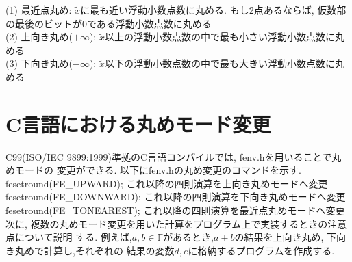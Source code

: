 \documentclass[11pt,a4paper]{jsreport}
\theoremstyle{definition}
\begin{document}
\noindent (1) 最近点丸め: $\tilde{x}$に最も近い浮動小数点数に丸める. もし2点あるならば, 仮数部の最後のビットが0である浮動小数点数に丸める \\
(2) 上向き丸め($+\infty$): $\tilde{x}$以上の浮動小数点数の中で最も小さい浮動小数点数に丸める \\
(3) 下向き丸め($-\infty$): $\tilde{x}$以下の浮動小数点数の中で最も大きい浮動小数点数に丸める \\
\section{C言語における丸めモード変更}
  C99(ISO/IEC 9899:1999)準拠のC言語コンパイルでは, fenv.hを用いることで丸めモードの
変更ができる. 以下にfenv.hの丸め変更のコマンドを示す. \\
	fesetround(FE\_UPWARD); これ以降の四則演算を上向き丸めモードへ変更 \\
	fesetround(FE\_DOWNWARD); これ以降の四則演算を下向き丸めモードへ変更 \\
	fesetround(FE\_TONEAREST); これ以降の四則演算を最近点丸めモードへ変更 \\
  次に, 複数の丸めモード変更を用いた計算をプログラム上で実装するときの注意点について説明
する. 例えば,$a,b \in \mathbb{F}$があるとき,$a + b$の結果を上向き丸め, 下向き丸めで計算し,それぞれの
結果の変数$d, e$に格納するプログラムを作成する.
\end{document}
